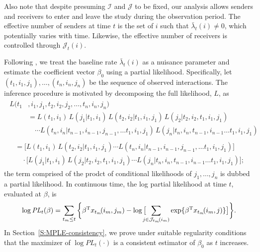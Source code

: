 \documentclass[final]{statsoc}
\begin{document}
Also note that despite presuming $\mathcal{I}$ and $\mathcal{J}$ to be fixed,
our analysis
allows senders and receivers to enter and leave the study during the
observation period.  The effective number of senders at time $t$ is the
set of $i$ such that $\bar \lambda_t(i) \neq 0$, which potentially varies
with time.  Likewise, the effective number of receivers is controlled through
$\mathcal{J}_t(i)$.

Following \citet{cox1975partial}, we treat the baseline rate
$\bar \lambda_t(i)$ as a nuisance parameter and estimate the coefficient
vector $\beta_0$ using a partial likelihood.  Specifically, let
$(t_1, i_1, j_1), \ldots, (t_n, i_n, j_n)$ be the sequence of observed
interactions.  The inference procedure is motivated by decomposing
the full likelihood, $L$, as
\begin{align*}
    \begin{split}
    L(t_1&, i_1, j_1, t_2, i_2, j_2, \ldots, t_n, i_n, j_n) \\
        &=
            L(t_1, i_1)
            \, L(j_1 | t_1, i_1)
            \, L(t_2, i_2 | t_1, i_1, j_1)
            \, L(j_2 | t_2, i_2, t_1, i_1, j_1) \\
        &\quad \cdots
            L(t_n, i_n | t_{n-1}, i_{n-1}, j_{n-1}, \ldots t_1, i_1, j_1)
            \, L(j_n | t_n, i_n, t_{n-1}, i_{n-1} \ldots t_1, i_1, j_1)
    \end{split} \\
    \begin{split}
        &=
            \Big[
                L(t_1, i_1)
                \, L(t_2, i_2 | t_1, i_1, j_1)
                \cdots
                L(t_n, i_n | t_{n-1}, i_{n-1}, j_{n-1}, \ldots t_1, i_1, j_1)
            \Big] \\
        &\quad
            \cdot
            \Big[
                L(j_1 | t_1, i_1)
                \, L(j_2 | t_2, i_2, t_1, i_1, j_1)
                \cdots
                L(j_n | t_n, i_n, t_{n-1}, i_{n-1} \ldots t_1, i_1, j_1)
            \Big];
    \end{split}
\end{align*}
the term comprised of the prodct of conditional likelihoods of $j_1,
\dotsc, j_n$ is dubbed a partial likelihood.  In continuous time,
the log partial likelihood at time $t$, evaluated at $\beta$, is
\begin{equation}\label{E:log-pl}
    \log
    \mathit{PL}_t(\beta)
        =
        \sum_{t_m \leq t}
        \bigg\{
            \beta^{\mathrm{T}} x_{t_m}\!(i_m, j_m)
            -
            \log\big[
                \!\!\!\!
                \sum_{j \in \mathcal{J}_{t_m}\!(i_m)}
                    \exp\{ \beta^{\mathrm{T}} x_{t_m}\!(i_m, j)\}
            \big]
        \bigg\}.
\end{equation}
In Section~\ref{S:MPLE-consistency}, we prove under suitable regularity
conditions that the maximizer of $\log \mathit{PL}_t(\cdot)$ is a
consistent estimator of $\beta_0$ as $t$ increases.
\end{document}
